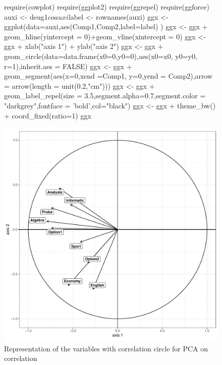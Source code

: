 \documentclass[a4paper,10pt]{article}
\begin{document}
\begin{figure}[H]
\begin{center}
\begin{Schunk}
\begin{Sinput}
  require(cowplot)
  require(ggplot2)
  require(ggrepel)
  require(ggforce)
  auxi <- deug1$co
  auxi$label <- rownames(auxi)
  ggx <- ggplot(data=auxi,aes(Comp1,Comp2,label=label) )
  ggx <- ggx + geom_hline(yintercept = 0)+geom_vline(xintercept = 0)
  ggx <- ggx + xlab("axis 1") + ylab("axis 2")
  ggx <- ggx + geom_circle(data=data.frame(x0=0,y0=0),aes(x0=x0, y0=y0, r=1),inherit.aes = FALSE)
  ggx <- ggx + geom_segment(aes(x=0,xend =Comp1, y=0,yend = Comp2),arrow = arrow(length = unit(0.2,"cm")))
  ggx <- ggx + geom_label_repel(size = 3.5,segment.alpha=0.7,segment.color = "darkgrey",fontface = 'bold',col="black")
  ggx <- ggx + theme_bw() + coord_fixed(ratio=1)
  ggx
\end{Sinput}
\end{Schunk}
\includegraphics{figs/sweave-cocircle}
\caption{Representation of the variables with correlation circle for PCA on correlation}
\label{fig:cocircle}
\end{center}
\end{figure}
\end{document}
